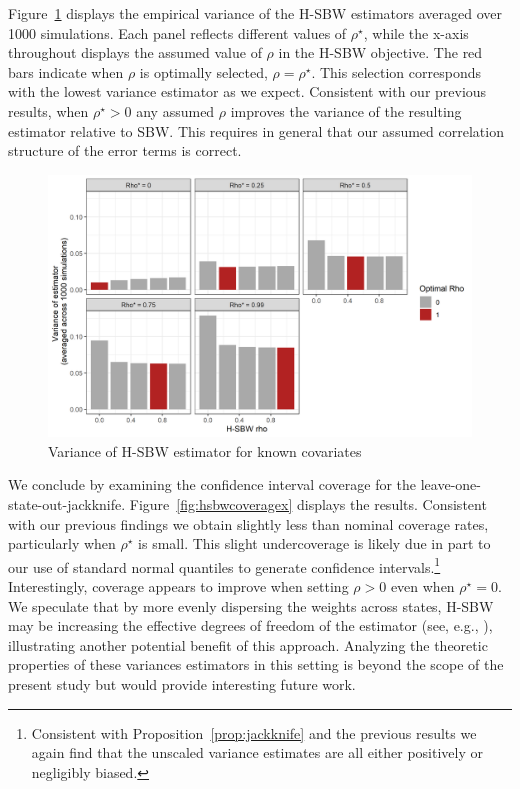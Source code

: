 Figure~\ref{fig:hsbwvarx} displays the empirical variance of the H-SBW estimators averaged over 1000 simulations. Each panel reflects different values of $\rho^\star$, while the x-axis throughout displays the assumed value of $\rho$ in the H-SBW objective. The red bars indicate when $\rho$ is optimally selected, $\rho = \rho^\star$. This selection corresponds with the lowest variance estimator as we expect. Consistent with our previous results, when $\rho^\star > 0$ any assumed $\rho$ improves the variance of the resulting estimator relative to SBW. This requires in general that our assumed correlation structure of the error terms is correct.

\begin{figure}[H]
\begin{center}
    \caption{Variance of H-SBW estimator for known covariates}\label{fig:hsbwvarx}
    \includegraphics[scale=0.5]{01_Plots/variance-x-plot.png}
\end{center}
\end{figure}

We conclude by examining the confidence interval coverage for the leave-one-state-out-jackknife. Figure~\ref{fig:hsbwcoveragex} displays the results. Consistent with our previous findings we obtain slightly less than nominal coverage rates, particularly when $\rho^\star$ is small. This slight undercoverage is likely due in part to our use of standard normal quantiles to generate confidence intervals.\footnote{Consistent with Proposition~\ref{prop:jackknife} and the previous results we again find that the unscaled variance estimates are all either positively or negligibly biased.} Interestingly, coverage appears to improve when setting $\rho > 0$ even when $\rho^\star = 0$. We speculate that by more evenly dispersing the weights across states, H-SBW may be increasing the effective degrees of freedom of the estimator (see, e.g., \citet{cameron2015practitioner}), illustrating another potential benefit of this approach. Analyzing the theoretic properties of these variances estimators in this setting is beyond the scope of the present study but would provide interesting future work.

